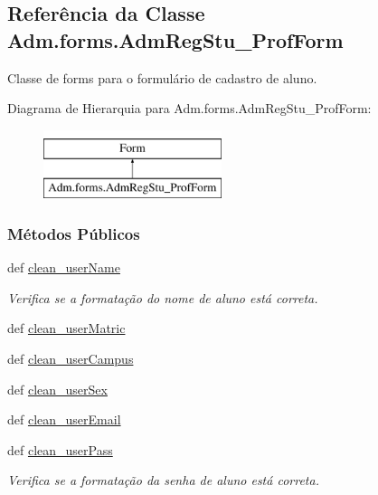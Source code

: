 \hypertarget{classAdm_1_1forms_1_1AdmRegStu__ProfForm}{\subsection{Referência da Classe Adm.\-forms.\-Adm\-Reg\-Stu\-\_\-\-Prof\-Form}
\label{classAdm_1_1forms_1_1AdmRegStu__ProfForm}
}


Classe de forms para o formulário de cadastro de aluno.  


Diagrama de Hierarquia para Adm.\-forms.\-Adm\-Reg\-Stu\-\_\-\-Prof\-Form\-:\begin{figure}[H]
\begin{center}
\leavevmode
\includegraphics[height=2.000000cm]{d5/d88/classAdm_1_1forms_1_1AdmRegStu__ProfForm}
\end{center}
\end{figure}
\subsubsection*{Métodos Públicos}
\begin{DoxyCompactItemize}
\item 
def \hyperlink{classAdm_1_1forms_1_1AdmRegStu__ProfForm_a9e03034d573c6875f0fa14a34cbfb62f}{clean\-\_\-user\-Name}
\begin{DoxyCompactList}\small\item\em Verifica se a formatação do nome de aluno está correta. \end{DoxyCompactList}\item 
def \hyperlink{classAdm_1_1forms_1_1AdmRegStu__ProfForm_a1af070695c9fa22eed6d77684cf4625f}{clean\-\_\-user\-Matric}
\item 
def \hyperlink{classAdm_1_1forms_1_1AdmRegStu__ProfForm_aaef53dc13585bd4111c6af2e7d37beb8}{clean\-\_\-user\-Campus}
\item 
def \hyperlink{classAdm_1_1forms_1_1AdmRegStu__ProfForm_a4f5e5eaaec2bd840dbd7f42789f6653f}{clean\-\_\-user\-Sex}
\item 
def \hyperlink{classAdm_1_1forms_1_1AdmRegStu__ProfForm_ad536dd1ac5f2f78cbee94bfcc9c12e8e}{clean\-\_\-user\-Email}
\item 
def \hyperlink{classAdm_1_1forms_1_1AdmRegStu__ProfForm_a8d8e75e4acd91204d62ae15f9b40e48f}{clean\-\_\-user\-Pass}
\begin{DoxyCompactList}\small\item\em Verifica se a formatação da senha de aluno está correta. \end{DoxyCompactList}\end{DoxyCompactItemize}
